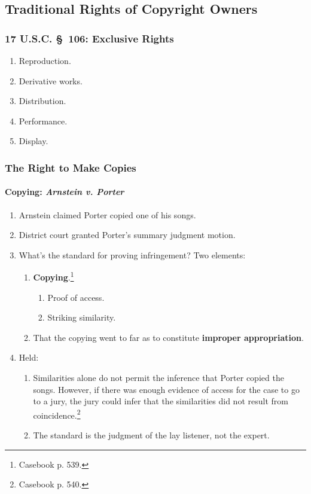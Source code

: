 \subsection{Traditional Rights of Copyright Owners}

\subsubsection{17 U.S.C. \S\ 106: Exclusive Rights}

\begin{enumerate}
    \item Reproduction.
    \item Derivative works.
    \item Distribution.
    \item Performance.
    \item Display.
\end{enumerate}

\subsubsection{The Right to Make Copies}

\paragraph{Copying: \emph{Arnstein v. Porter}}

\begin{enumerate}
    \item Arnstein claimed Porter copied one of his songs.
    \item District court granted Porter's summary judgment motion.
    \item What's the standard for proving infringement? Two elements:
    \begin{enumerate}
        \item \textbf{Copying}.\footnote{Casebook p. 539.}
        \begin{enumerate}
            \item Proof of access.
            \item Striking similarity.
        \end{enumerate}
        \item That the copying went to far as to constitute \textbf{improper 
        appropriation}.
    \end{enumerate}
    \item Held:
    \begin{enumerate}
        \item Similarities alone do not permit the inference that Porter 
        copied the songs. However, if there was enough evidence of access for 
        the case to go to a jury, the jury could infer that the similarities 
        did not result from coincidence.\footnote{Casebook p. 540.}
        \item The standard is the judgment of the lay listener, not the 
        expert.
    \end{enumerate}
\end{enumerate}


